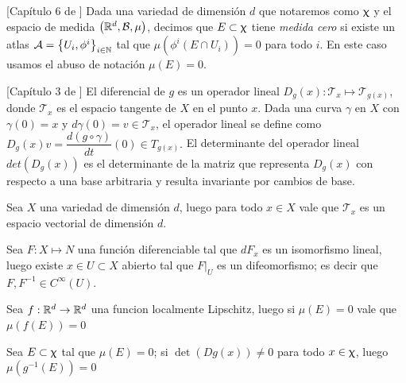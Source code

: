 \begin{definition}{[Cap\'itulo 6 de \cite{lee:00}]}
	Dada una variedad de dimensi\'on $d$ que notaremos como $\upchi$ y el espacio de medida $\left({\mathbb{R}}^d, \mathcal{B}, \mu\right)$, decimos que $E \subset \upchi$ tiene \textit{medida cero} si existe un atlas $\mathcal{A} = \left\lbrace U_i, \phi^i\right\rbrace_{i \in {\mathbb{N}}}$ tal que $\mu \left(\phi^i \left(E \cap U_i \right) \right) = 0$ para todo $i$. En este caso usamos el abuso de notaci\'on $\mu(E) = 0$.
\end{definition}

\begin{definition}{[Cap\'itulo 3 de \cite{lee:00}]}
	El diferencial de $g$ es un operador lineal $D_g(x): \mathcal{T}_x \mapsto \mathcal{T}_{g (x)}$, donde $\mathcal{T}_x$ es el espacio tangente de $X$ en el punto $x$. Dada una curva $\gamma$
	en $X$ con $\gamma(0) = x$ y $d\gamma(0) = v \in \mathcal{T}_x$, el operador lineal se define como $D_g(x)v = \dfrac{d (g\circ \gamma)}{dt}(0) \in T_{g (x)}.$ El determinante del operador lineal $det (D_g (x))$ es el determinante de la matriz que representa $D_g (x)$ con respecto a una base arbitraria y resulta invariante por cambios de base.
\end{definition}

\begin{proposition}
	Sea $X$ una variedad de dimensi\'on $d$, luego para todo $x \in X$ vale que $\mathcal{T}_x$ es un espacio vectorial de dimensi\'on $d$.
\end{proposition}

\begin{theorem}
	\label{theorem: Teorema de la funcion inversa}
	Sea $F: X \mapsto N$ una funci\'on diferenciable tal que $dF_x$ es un isomorfismo lineal, luego existe $x \in U \subset X$ abierto tal que $F \vert_U$ es un difeomorfismo; es decir que $F, F^{-1} \in C^{\infty}(U)$.
\end{theorem}

\begin{proposition}
	\label{prop: Localmente Lipschitz preserva medida}
	Sea $f : {\mathbb{R}}^d \rightarrow {\mathbb{R}}^d$ una funcion localmente Lipschitz, luego si $\mu(E) = 0$ vale que $\mu(f(E)) = 0$
\end{proposition}

\begin{lemma}
	\label{Difeomorfismos locales preservan medida cero}
	Sea $E \subset \upchi$ tal que $\mu(E) = 0$; si $\det \left(Dg(x)\right) \neq 0$ para todo $x \in \upchi$, luego $\mu\left(g^{-1}(E)\right) = 0$
\end{lemma}

